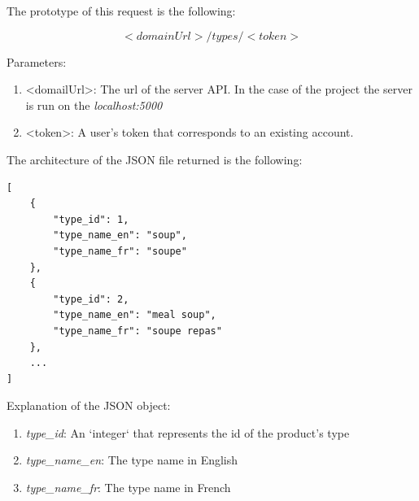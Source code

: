 The prototype of this request is the following:

$$<domainUrl>/types/<token>$$

Parameters:
\begin{enumerate}
\item <domailUrl>: The url of the server API. In the case of the project the server is run on the \textit{localhost:5000}
\item <token>: A user's token that corresponds to an existing account.
\end{enumerate}

The architecture of the JSON file returned is the following:
\begin{lstlisting}
[
    {
        "type_id": 1,
        "type_name_en": "soup",
        "type_name_fr": "soupe"
    },
    {
        "type_id": 2,
        "type_name_en": "meal soup",
        "type_name_fr": "soupe repas"
    },
    ...
]
\end{lstlisting}

Explanation of the  JSON object:
\begin{enumerate}
\item \textit{type\_id}: An `integer` that represents the id of the product's type
\item \textit{type\_name\_en}: The type name in English
\item \textit{type\_name\_fr}: The type name in French
\end{enumerate}

